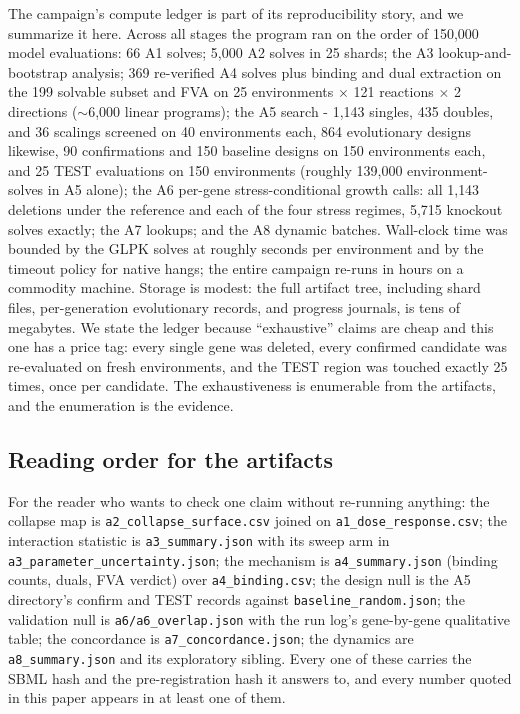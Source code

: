 \documentclass[12pt]{article}
\begin{document}
The campaign's compute ledger is part of its reproducibility story,
and we summarize it here. Across all stages the program ran on the
order of 150{,}000 model evaluations: 66 A1 solves; 5{,}000 A2 solves
in 25 shards; the A3 lookup-and-bootstrap analysis; 369 re-verified
A4 solves plus binding and dual extraction on the 199 solvable subset
and FVA on 25 environments $\times$ 121 reactions $\times$ 2
directions ($\sim$6{,}000 linear programs); the A5 search -
1{,}143 singles, 435 doubles, and 36 scalings screened on 40
environments each, 864 evolutionary designs likewise, 90
confirmations and 150 baseline designs on 150 environments each, and
25 TEST evaluations on 150 environments (roughly 139{,}000
environment-solves in A5 alone); the A6 per-gene stress-conditional
growth calls: all 1{,}143 deletions under the reference and each of
the four stress regimes, 5{,}715 knockout solves exactly; the A7
lookups; and the A8 dynamic batches. Wall-clock time was
bounded by the GLPK solves at roughly seconds per environment and by
the timeout policy for native hangs; the entire campaign re-runs in
hours on a commodity machine. Storage is modest: the full artifact
tree, including shard files, per-generation evolutionary records,
and progress journals, is tens of megabytes. We state the ledger
because ``exhaustive'' claims are cheap and this one has a price tag:
every single gene was deleted, every confirmed candidate was
re-evaluated on fresh environments, and the TEST region was touched
exactly 25 times, once per candidate. The exhaustiveness is
enumerable from the artifacts, and the enumeration is the evidence.

\subsection{Reading order for the artifacts}

For the reader who wants to check one claim without re-running
anything: the collapse map is \texttt{a2\_collapse\_surface.csv}
joined on \texttt{a1\_dose\_response.csv}; the interaction statistic
is \texttt{a3\_summary.json} with its sweep arm in
\texttt{a3\_parameter\_uncertainty.json}; the mechanism is
\texttt{a4\_summary.json} (binding counts, duals, FVA verdict) over
\texttt{a4\_binding.csv}; the design null is the A5 directory's
confirm and TEST records against \texttt{baseline\_random.json}; the
validation null is \texttt{a6/a6\_overlap.json} with the run log's
gene-by-gene qualitative table; the concordance is
\texttt{a7\_concordance.json}; the dynamics are
\texttt{a8\_summary.json} and its exploratory sibling. Every one of
these carries the SBML hash and the pre-registration hash it answers
to, and every number quoted in this paper appears in at least one of
them.
\end{document}
